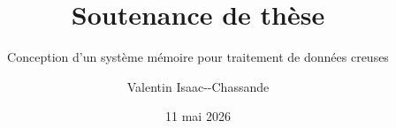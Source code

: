 
\RequirePackage{silence}

\usepackage{appendixnumberbeamer}
\usepackage[utf8]{inputenc}
\usepackage[T1]{fontenc}
\usepackage{textcomp}
\usepackage[french]{babel}
\usepackage{setspace}
\usepackage{bookman}
\usepackage{latexsym}
\usepackage{amsmath}
\usepackage{amsfonts}
\usepackage[dvipsnames, table]{xcolor}
\usepackage{pifont}
\usepackage{multicol}
\usepackage{booktabs}
\usepackage{graphicx}
\usepackage{pstricks}
\usepackage{MnSymbol}
\usepackage{tikz}
\usetikzlibrary{fit,shapes.arrows,arrows.meta,shadows.blur}
\usepackage[most]{tcolorbox}
\usepackage{tabularray}
\usepackage{stackengine}
\usepackage{calligra}
\usepackage{fontawesome}
\usepackage{animate}
\usepackage{pifont}
\usepackage{algorithm2e}


\usepackage{hyperref}
\hypersetup{ %
    colorlinks=true,                %
    breaklinks=true,                %
    urlcolor= black,                 %
    linkcolor= black,               %
    citecolor= black                %
}


\author{Valentin Isaac-{-}Chassande}
\title{Soutenance de thèse}
\subtitle{Conception d'un système mémoire pour traitement de données creuses}
\date{11 mai 2026}


\def\cmd#1{\texttt{\color{red}\footnotesize $\backslash$#1}}
\def\env#1{\texttt{\color{blue}\footnotesize #1}}

\def\maincolor{Dandelion} %

\makeatletter
\newcount\my@repeat@count
\newcommand{\myrepeat}[2]{%
  \begingroup
  \my@repeat@count=\z@
  \@whilenum\my@repeat@count<#1\do{#2\advance\my@repeat@count\@ne}%
  \endgroup
}
\makeatother

